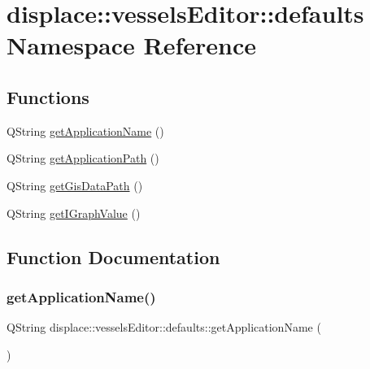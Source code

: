 \hypertarget{namespacedisplace_1_1vessels_editor_1_1defaults}{}\section{displace\+::vessels\+Editor\+::defaults Namespace Reference}
\label{namespacedisplace_1_1vessels_editor_1_1defaults}
\subsection*{Functions}
\begin{DoxyCompactItemize}
\item 
Q\+String \mbox{\hyperlink{namespacedisplace_1_1vessels_editor_1_1defaults_aa7475689d3916a5463d36ab27c2b381c}{get\+Application\+Name}} ()
\item 
Q\+String \mbox{\hyperlink{namespacedisplace_1_1vessels_editor_1_1defaults_a9e8f55e69be8e18ff7c5fcc57b847885}{get\+Application\+Path}} ()
\item 
Q\+String \mbox{\hyperlink{namespacedisplace_1_1vessels_editor_1_1defaults_adb335715a841ad4f692202d9e578d28c}{get\+Gis\+Data\+Path}} ()
\item 
Q\+String \mbox{\hyperlink{namespacedisplace_1_1vessels_editor_1_1defaults_acc8e49b83aade8ae589654ed7d57094d}{get\+I\+Graph\+Value}} ()
\end{DoxyCompactItemize}


\subsection{Function Documentation}
\mbox{\label{namespacedisplace_1_1vessels_editor_1_1defaults_aa7475689d3916a5463d36ab27c2b381c}} 
\subsubsection{\texorpdfstring{getApplicationName()}{getApplicationName()}}
{\footnotesize\ttfamily Q\+String displace\+::vessels\+Editor\+::defaults\+::get\+Application\+Name (\begin{DoxyParamCaption}{ }\end{DoxyParamCaption})}

